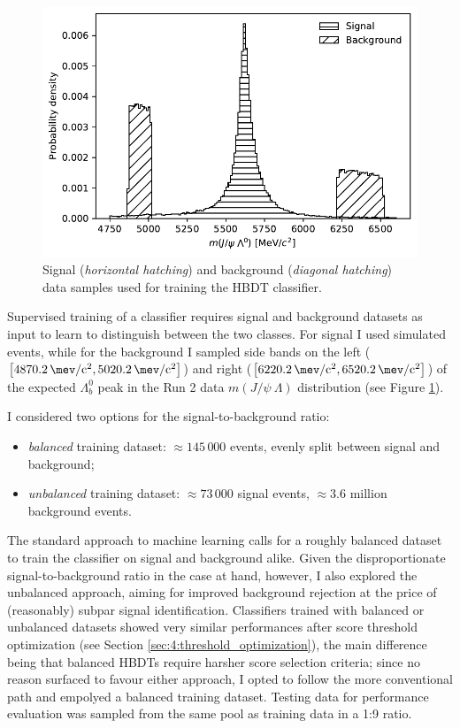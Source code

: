 \begin{figure}[t]
	\centering
	\includegraphics[width=.6\textwidth]{graphics/04-event_selection/sig_bkg_distribution_balance.pdf}
	\caption{Signal (\textit{horizontal hatching}) and background (\textit{diagonal hatching}) data samples used for training the HBDT classifier.
	}
	\label{fig:4:HBDT_training_data}
\end{figure}

Supervised training of a classifier requires signal and background datasets as input to learn to distinguish between the two classes.
For signal I used simulated \demonstratorshort events, while for the background I sampled side bands on the left ($\left[\SI{4870.2}{\mev \per c^2}, \SI{5020.2}{\mev \per c^2}\right]$) and right ($\left[\SI{6220.2}{\mev \per c^2}, \SI{6520.2}{\mev \per c^2}\right]$) of the expected $\Lambda_b^0$ peak  in the Run 2 data $m(J/\psi~\Lambda)$ distribution (see Figure \ref{fig:4:HBDT_training_data}).

I considered two options for the signal-to-background ratio:
\begin{itemize}
	\item \textit{balanced} training dataset: $\approx 145\,000$ events, evenly split between signal and background;
	\item \textit{unbalanced} training dataset: $\approx 73\,000$ signal events, $\approx 3.6$ million background events.
\end{itemize}
The standard approach to machine learning calls for a roughly balanced dataset to train the classifier on signal and background alike.
Given the disproportionate signal-to-background ratio in the case at hand, however, I also explored the unbalanced approach, aiming for improved background rejection at the price of (reasonably) subpar signal identification.
Classifiers trained with balanced or unbalanced datasets showed very similar performances after score threshold optimization (see Section \ref{sec:4:threshold_optimization}), the main difference being that balanced HBDTs require harsher score selection criteria;
since no reason surfaced to favour either approach, I opted to follow the more conventional path and empolyed a balanced training dataset.
Testing data for performance evaluation was sampled from the same pool as training data in a 1:9 ratio.

